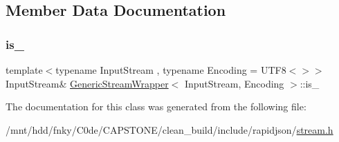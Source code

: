 \subsection{Member Data Documentation}
\mbox{\label{classGenericStreamWrapper_a2b44ae2c9460c2e18aca6ba25c537cc5}} 
\subsubsection{\texorpdfstring{is\+\_\+}{is\_}}
{\footnotesize\ttfamily template$<$typename Input\+Stream , typename Encoding  = U\+T\+F8$<$$>$$>$ \\
Input\+Stream\& \hyperlink{classGenericStreamWrapper}{Generic\+Stream\+Wrapper}$<$ Input\+Stream, Encoding $>$\+::is\+\_\+\hspace{0.3cm}{\ttfamily [protected]}}



The documentation for this class was generated from the following file\+:\begin{DoxyCompactItemize}
\item 
/mnt/hdd/fnky/\+C0de/\+C\+A\+P\+S\+T\+O\+N\+E/clean\+\_\+build/include/rapidjson/\hyperlink{stream_8h}{stream.\+h}\end{DoxyCompactItemize}
